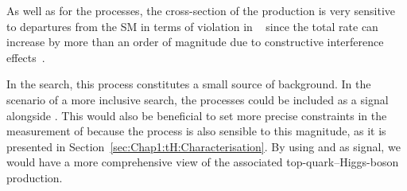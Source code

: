 \begin{comment}
\begin{figure}
\centering
\begin{subfigure}{.37\textwidth}
  \centering
  \texttt{[image: Chapter1/tWH\_A]}
  \caption{}
  \label{fig:Chap1:tH:tWH:A}
\end{subfigure}%
\begin{subfigure}{.27\textwidth}
  \centering
  \texttt{[image: Chapter1/tWH\_B]}
  \caption{}
  \label{fig:Chap1:tH:tWH:B}
\end{subfigure}%
\begin{subfigure}{.27\textwidth}
  \centering
  \texttt{[image: Chapter1/tWH\_C]}
  \caption{}
  \label{fig:Chap1:tH:tWH:C}
\end{subfigure} %
\begin{subfigure}{.36\textwidth}
  \centering
  \texttt{[image: Chapter1/tWH\_D]}
  \caption{}
  \label{fig:Chap1:tH:tWH:D}
\end{subfigure}%
\begin{subfigure}{.27\textwidth}
  \centering
  \texttt{[image: Chapter1/tWH\_E]}
  \caption{}
  \label{fig:Chap1:tH:tWH:E}
\end{subfigure}%
\caption{LO Feynman diagrams for $\Ptop\PWminus\PHiggs$ production in the 5FS. 
Diagrams extracted from Reference~\cite{Demartin:2016axk}.}
\label{fig:Chap1:tH:tW}
\end{figure}
\end{comment}


As well as for the \tHq processes, the cross-section of the \tWH production is
very sensitive to departures from the SM in terms of \CP violation in \yt~\cite{Demartin:2016axk}
since the total rate can increase by more than an order of magnitude due
to constructive interference effects~\cite{Farina:2012xp, Demartin:2015uha}.


In the \tHq search, this process constitutes a small source of 
background. 
In the scenario of a more inclusive \tH search, the \tWH processes could 
be included as a signal alongside \tHq. This would also be beneficial
to set more precise constraints in the measurement of \yt because the 
\tWH process is also sensible to this magnitude, as it is presented
in Section~\ref{sec:Chap1:tH:Characterisation}. By using \tHq and \tWH
as signal, we would have a more comprehensive view of the associated
top-quark--Higgs-boson production. 


